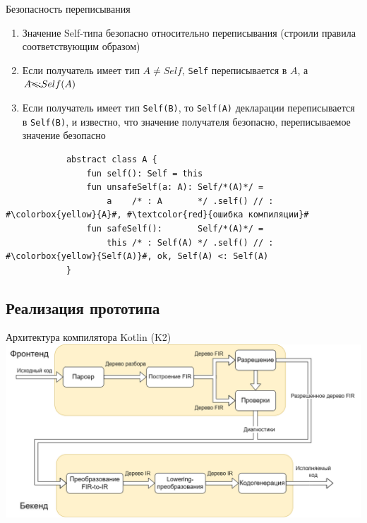 \documentclass[usenames, dvipsnames]{beamer}
\begin{document}
    \begin{frame}[fragile]{Безопасность переписывания}
        \begin{enumerate}
            \item Значение Self-типа безопасно относительно переписывания (строили правила соответствующим образом)
            \item Если получатель имеет тип $A \neq Self$, \texttt{Self} переписывается в $A$, а $A \bcancel{<:} Self(A)$
            \item Если получатель имеет тип \texttt{Self(B)}, то \texttt{Self(A)} декларации переписывается в \texttt{Self(B)}, и известно, что значение получателя безопасно, переписываемое значение безопасно
        \end{enumerate}

        \vspace{1em}
        \begin{verbatim}
            abstract class A {
                fun self(): Self = this
                fun unsafeSelf(a: A): Self/*(A)*/ =
                    a    /* : A       */ .self() // : #\colorbox{yellow}{A}#, #\textcolor{red}{ошибка компиляции}#
                fun safeSelf():       Self/*(A)*/ =
                    this /* : Self(A) */ .self() // : #\colorbox{yellow}{Self(A)}#, ok, Self(A) <: Self(A)
            }
        \end{verbatim}
    \end{frame}


    \subsection{Реализация прототипа}

    \begin{frame}{Архитектура компилятора Kotlin (K2)}
        \includegraphics[width=\textwidth]{fig/arch}
    \end{frame}
\end{document}
